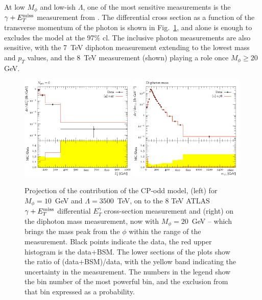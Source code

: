 \documentclass[11pt]{cernrep}
\begin{document}
At low $M_\phi$ and low-ish $\Lambda$, one of the most sensitive measurements is the $\gamma+E_T^{\rm miss}$ measurement 
from \cite{Aad:2013izg}. The differential cross section as a function of the transverse momentum of the photon 
is shown in Fig.~\ref{fig:cpo_lowlow}, and alone is enough to excludes the model at the 97\% cl.
The inclusive photon measurements are also sensitive, with the 7~TeV diphoton measurement extending to
the lowest mass and $p_T$ values, and the 8~TeV measurement (shown) playing a role once $M_\phi \geq 20$ GeV.

\begin{figure}
\begin{center}
\includegraphics[width=0.49\textwidth]{ATLAS_2016_I1448301_NU_d08-x01-y01-10-3500.pdf}
\includegraphics[width=0.49\textwidth]{ATLAS_2017_I1591327_d02-x01-y01-20-3500.pdf}
    \caption{Projection of the contribution of the CP-odd model, (left) for $M_{\phi} = 10$~GeV and $\Lambda = 3500$~TeV, on to the 
8 TeV ATLAS $\gamma+E_T^{\rm miss}$ differential $E_T^\gamma$ cross-section measurement  and (right) on the 
diphoton mass measurement, now with $M_{\phi} = 20$~GeV -- which brings the mass peak from the $\phi$ within
the range of the measurement.
Black points indicate the data, the red upper histogram is the data+BSM. The lower sections of the plots show the ratio of 
(data+BSM)/data, with the yellow band indicating the uncertainty in the measurement. 
The numbers in the legend show the bin number of the most powerful bin, and the exclusion from that bin expressed as a 
probability.}
\label{fig:cpo_lowlow}
\end{center}
\end{figure}
\end{document}
